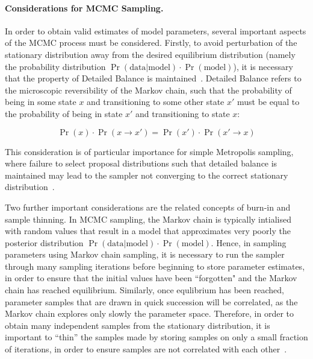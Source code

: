\paragraph{Considerations for MCMC Sampling.}
\label{par:balance}
In order to obtain valid estimates of model parameters, several important aspects of the MCMC process must be considered. Firstly, to avoid perturbation of the stationary distribution away from the desired equilibrium distribution (namely the probability distribution $\Pr(\text{data}|\text{model}) \cdot \Pr(\text{model})$), it is necessary that the property of Detailed Balance is maintained~\cite{O'Hagan2004}. Detailed Balance refers to the microscopic reversibility of the Markov chain, such that the probability of being in some state $x$ and transitioning to some other state $x'$ must be equal to the probability of being in state $x'$ and transitioning to state $x$:

\begin{equation}
\Pr(x)\cdot\Pr(x \rightarrow x') = \Pr(x')\cdot\Pr(x' \rightarrow x)
\label{eq:balance}
\end{equation}

This consideration is of particular importance for simple Metropolis sampling, where failure to select proposal distributions such that detailed balance is maintained may lead to the sampler not converging to the correct stationary distribution~\cite{Kelly2011}.

Two further important considerations are the related concepts of burn-in and sample thinning. In MCMC sampling, the Markov chain is typically intialised with random values that result in a model that approximates very poorly the posterior distribution $\Pr(\text{data}|\text{model}) \cdot \Pr(\text{model})$. Hence, in sampling parameters using Markov chain sampling, it is necessary to run the sampler through many sampling iterations before beginning to store parameter estimates, in order to ensure that the initial values have been ``forgotten" and the Markov chain has reached equilibrium. Similarly, once equlibrium has been reached, parameter samples that are drawn in quick succession will be correlated, as the Markov chain explores only slowly the parameter space. Therefore, in order to obtain many independent samples from the stationary distribution, it is important to ``thin'' the samples made by storing samples on only a small fraction of iterations, in order to ensure samples are not correlated with each other~\cite{Casella1992}.    


